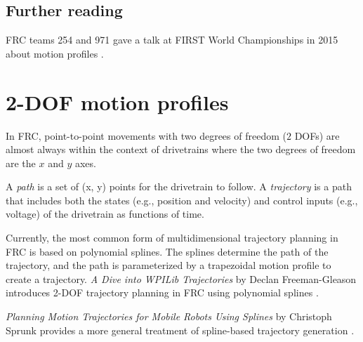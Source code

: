 \subsection{Further reading}

FRC teams 254 and 971 gave a talk at FIRST World Championships in 2015 about
motion profiles \cite{bib:motion_profiles}.

\section{2-DOF motion profiles}

In FRC, point-to-point movements with two degrees of freedom ($2$ DOFs) are
almost always within the context of drivetrains where the two degrees of freedom
are the $x$ and $y$ axes.

A \textit{path} is a set of (x, y) points for the drivetrain to follow. A
\textit{trajectory} is a path that includes both the states (e.g., position and
velocity) and control inputs (e.g., voltage) of the drivetrain as functions of
time.

Currently, the most common form of multidimensional trajectory planning in FRC
is based on polynomial splines. The splines determine the path of the
trajectory, and the path is parameterized by a trapezoidal motion profile to
create a trajectory. \textit{A Dive into WPILib Trajectories} by Declan
Freeman-Gleason introduces 2-DOF trajectory planning in FRC using polynomial
splines \cite{bib:a_dive_into_wpilib_trajectories}.

\textit{Planning Motion Trajectories for Mobile Robots Using Splines} by
Christoph Sprunk provides a more general treatment of spline-based trajectory
generation \cite{bib:spline_traj_sprunk}.
